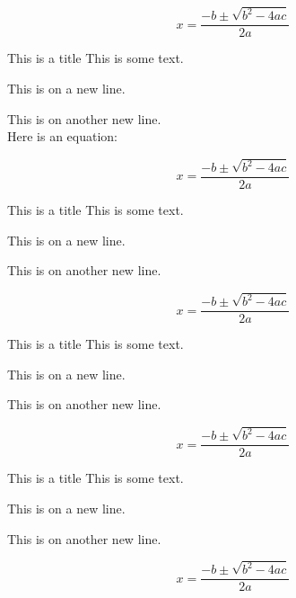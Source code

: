 



\lipsum[10]


\begin{equation*}
    x = \frac{-b \pm \sqrt{b^2 - 4ac}}{2a}
\end{equation*}

\begin{greybox}{This is a title}
    This is some text.

    This is on a new line.

    This is on another new line.\\
    Here is an equation:

    \begin{equation*}
        x = \frac{-b \pm \sqrt{b^2 - 4ac}}{2a}
    \end{equation*}
\end{greybox}

\begin{redbox}{This is a title}
    This is some text.

    This is on a new line.

    This is on another new line.

    \begin{equation*}
        x = \frac{-b \pm \sqrt{b^2 - 4ac}}{2a}
    \end{equation*}
\end{redbox}

\begin{bluebox}{This is a title}
    This is some text.

    This is on a new line.

    This is on another new line.

    \begin{equation*}
        x = \frac{-b \pm \sqrt{b^2 - 4ac}}{2a}
    \end{equation*}
\end{bluebox}

\begin{greenbox}{This is a title}
    This is some text.

    This is on a new line.

    This is on another new line.

    \begin{equation*}
        x = \frac{-b \pm \sqrt{b^2 - 4ac}}{2a}
    \end{equation*}
\end{greenbox}

